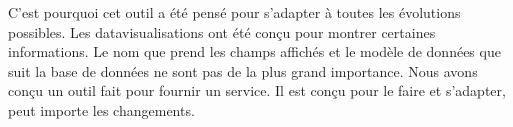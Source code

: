 
C'est pourquoi cet outil a été pensé pour s'adapter à toutes les évolutions possibles. Les datavisualisations ont été conçu pour montrer certaines informations. Le nom que prend les champs affichés et le modèle de données que suit la base de données ne sont pas de la plus grand importance. Nous avons conçu un outil fait pour fournir un service. Il est conçu pour le faire et s'adapter, peut importe les changements. 